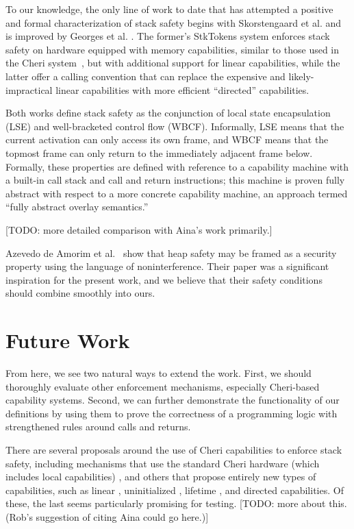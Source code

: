 \documentclass[10pt,conference]{ieeetran}%
\theoremstyle{definition}
\begin{document}
%
To our knowledge, the only line of work to date that has attempted
a positive and formal characterization of stack safety
begins with Skorstengaard et al. \cite{SkorstengaardSTKJFP} and is improved
by Georges et al. \cite{Georges22:TempsDesCerises}. The former's
StkTokens system enforces stack safety on hardware equipped with
memory capabilities, similar to those used in the Cheri system~\cite{Woodruff+14,Chisnall+15}, but
with additional support for linear capabilities, while the latter offer a calling
convention that can replace the expensive and likely-impractical linear capabilities
with more efficient ``directed'' capabilities.

Both works define stack safety as the conjunction of local state encapsulation (LSE) and
well-bracketed control flow (WBCF).
Informally, LSE means that the current activation can only access its own frame,
and WBCF means that the topmost frame can only return to
the immediately adjacent frame below. Formally, these properties are defined
with reference to a capability machine with a built-in call stack and call and return
instructions; this machine is proven fully abstract with respect to a more
concrete capability machine, an approach termed ``fully abstract overlay semantics.''

[TODO: more detailed comparison with Aina's work primarily.]

%
Azevedo de Amorim et al.~\cite{DBLP:conf/post/AmorimHP18} show that
heap safety may be framed as a security property using
the language of noninterference. Their paper was a significant inspiration
for the present work, and we believe that their safety conditions should
combine smoothly into ours.

\section{Future Work}
\label{sec:future}

From here, we see two natural ways to extend the work.
First, we should thoroughly evaluate
other enforcement mechanisms, especially Cheri-based capability
systems. Second, we can further demonstrate
the functionality of our definitions by using them to prove
the correctness of a programming logic with strengthened rules around calls and returns.

%
There are several proposals around the use of Cheri capabilities to enforce stack safety,
including mechanisms that use the standard Cheri hardware (which includes local
capabilities) \cite{SkorstengaardLocal},
and others that propose entirely new types of capabilities, such as linear
\cite{SkorstengaardSTK}, uninitialized \cite{Georges+21}, lifetime
\cite{Tsampas+19}, and directed \cite{Georges22:TempsDesCerises} capabilities.
Of these, the last seems particularly promising for testing.
[TODO: more about this. (Rob's suggestion of citing Aina could go here.)]
\end{document}
